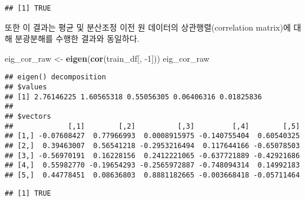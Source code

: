 \documentclass[]{book}
\newenvironment{Shaded}{\begin{snugshade}}{\end{snugshade}}
\newcommand{\DecValTok}[1]{\textcolor[rgb]{0.00,0.00,0.81}{#1}}
\newcommand{\KeywordTok}[1]{\textcolor[rgb]{0.13,0.29,0.53}{\textbf{#1}}}
\newcommand{\NormalTok}[1]{#1}
\newcommand{\OperatorTok}[1]{\textcolor[rgb]{0.81,0.36,0.00}{\textbf{#1}}}
\newcommand{\StringTok}[1]{\textcolor[rgb]{0.31,0.60,0.02}{#1}}
\begin{document}
\begin{Shaded}
\end{Shaded}

\begin{verbatim}
## [1] TRUE
\end{verbatim}

또한 이 결과는 평균 및 분산조정 이전 원 데이터의 상관행렬(correlation matrix)에 대해 분광분해를 수행한 결과와 동일하다.

\begin{Shaded}
\begin{Highlighting}[]
\NormalTok{eig_cor_raw <-}\StringTok{ }\KeywordTok{eigen}\NormalTok{(}\KeywordTok{cor}\NormalTok{(train_df[, }\DecValTok{-1}\NormalTok{]))}
\NormalTok{eig_cor_raw}
\end{Highlighting}
\end{Shaded}

\begin{verbatim}
## eigen() decomposition
## $values
## [1] 2.76146225 1.60565318 0.55056305 0.06406316 0.01825836
## 
## $vectors
##             [,1]        [,2]          [,3]         [,4]        [,5]
## [1,] -0.07608427  0.77966993  0.0008915975 -0.140755404  0.60540325
## [2,]  0.39463007  0.56541218 -0.2953216494  0.117644166 -0.65078503
## [3,] -0.56970191  0.16228156  0.2412221065 -0.637721889 -0.42921686
## [4,]  0.55982770 -0.19654293 -0.2565972887 -0.748094314  0.14992183
## [5,]  0.44778451  0.08636803  0.8881182665 -0.003668418 -0.05711464
\end{verbatim}

\begin{Shaded}
\end{Shaded}

\begin{verbatim}
## [1] TRUE
\end{verbatim}

\begin{Shaded}
\end{Shaded}
\end{document}

